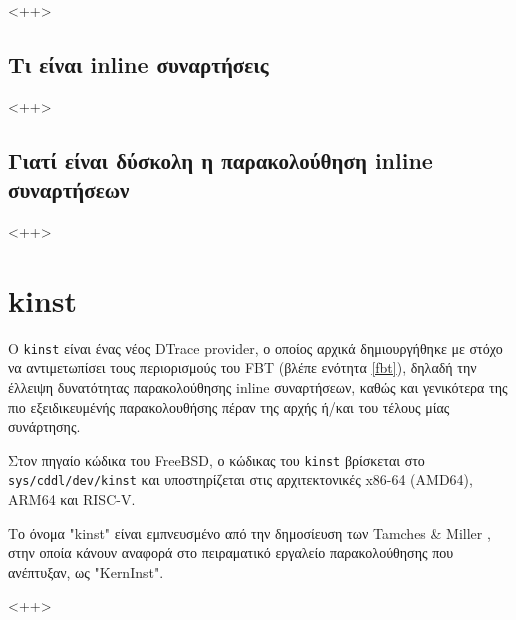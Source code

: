 \documentclass[12pt]{article}
\begin{document}
<++>

\subsection{Τι είναι inline συναρτήσεις}

<++>

\subsection{Γιατί είναι δύσκολη η παρακολούθηση inline συναρτήσεων}


<++>

\section{kinst}

%


Ο \lstinline{kinst} είναι ένας νέος DTrace provider, ο οποίος αρχικά
δημιουργήθηκε με στόχο να αντιμετωπίσει τους περιορισμούς του FBT (βλέπε
ενότητα \ref{fbt}), δηλαδή την έλλειψη δυνατότητας παρακολούθησης inline
συναρτήσεων, καθώς και γενικότερα της πιο εξειδικευμένής παρακολουθήσης πέραν
της αρχής ή/και του τέλους μίας συνάρτησης.

Στον πηγαίο κώδικα του FreeBSD, ο κώδικας του \lstinline{kinst} βρίσκεται στο
\lstinline{sys/cddl/dev/kinst} \cite{kinstsrc} και υποστηρίζεται στις
αρχιτεκτονικές x86-64 (AMD64), ARM64 και RISC-V.

Το όνομα "kinst" είναι εμπνευσμένο από την δημοσίευση των Tamches \& Miller
\cite{tamches}, στην οποία κάνουν αναφορά στο πειραματικό εργαλείο
παρακολούθησης που ανέπτυξαν, ως "KernInst".

<++>
\end{document}
